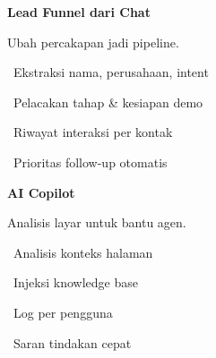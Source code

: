 \documentclass[a4paper]{article}
\begin{document}
\vspace{8pt}

\noindent
\begin{minipage}[t]{0.485\textwidth}
    \colorbox{PurplePrimary}{%
        \begin{minipage}{\dimexpr\textwidth-2\fboxsep\relax}
            {\fontsize{10}{13}\selectfont\bfseries\color{White} Lead Funnel dari Chat}
        \end{minipage}}\par
    \vspace{4pt}
    {\fontsize{9}{12}\selectfont\color{TextDark}%
    Ubah percakapan jadi pipeline.\par\vspace{3pt}
    \textbullet\ Ekstraksi nama, perusahaan, intent\par\vspace{2pt}%
    \textbullet\ Pelacakan tahap \& kesiapan demo\par\vspace{2pt}%
    \textbullet\ Riwayat interaksi per kontak\par\vspace{2pt}%
    \textbullet\ Prioritas follow-up otomatis}%

\end{minipage}%
\hfill
\begin{minipage}[t]{0.485\textwidth}
    \colorbox{BlueDark}{%
        \begin{minipage}{\dimexpr\textwidth-2\fboxsep\relax}
            {\fontsize{10}{13}\selectfont\bfseries\color{White} AI Copilot}
        \end{minipage}}\par
    \vspace{4pt}
    {\fontsize{9}{12}\selectfont\color{TextDark}%
    Analisis layar untuk bantu agen.\par\vspace{3pt}
    \textbullet\ Analisis konteks halaman\par\vspace{2pt}%
    \textbullet\ Injeksi knowledge base\par\vspace{2pt}%
    \textbullet\ Log per pengguna\par\vspace{2pt}%
    \textbullet\ Saran tindakan cepat}%

\end{minipage}

\vspace{8pt}
\end{document}
